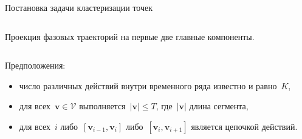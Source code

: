 \documentclass[10pt,pdf,hyperref={unicode}]{beamer}
\begin{document}
\begin{frame}[shrink=5]{Постановка задачи кластеризации точек}
\begin{center}
\begin{columns}
\begin{column}{0.55\textwidth}
			Проекция фазовых траекторий на первые две главные компоненты.
    		\end{column}
	\end{columns}
\end{center}

Предположения:
\begin{itemize}
	\item число различных действий внутри временного ряда известно и равно~$K$,
	\item для всех~$\textbf{v} \in \mathcal{V}$ выполняется~$\left|\textbf{v}\right| \leq T$, где~$\left|\textbf{v}\right|$ длина сегмента,
	\item для всех~$i$ либо~$[\textbf{v}_{i-1},\textbf{v}_{i}]$ либо~$[\textbf{v}_{i},\textbf{v}_{i+1}]$  является цепочкой действий.
\end{itemize}

\end{frame}
\end{document}
